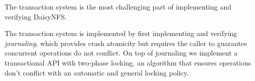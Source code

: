 The transaction system is the most challenging part of implementing and
verifying DaisyNFS.

The transaction system is implemented by first implementing and verifying
\emph{journaling}, which provides crash atomicity but requires the caller to
guarantee concurrent operations do not conflict. On top of journaling we
implement a transactional API with two-phase locking, an algorithm that ensures
operations don't conflict with an automatic and general locking policy.







%

